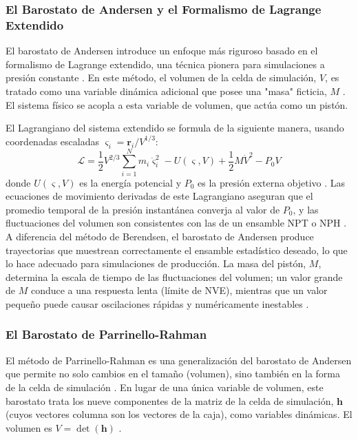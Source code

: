 \subsubsection{El Barostato de Andersen y el Formalismo de Lagrange Extendido}
El barostato de Andersen introduce un enfoque más riguroso basado en el formalismo de Lagrange extendido, una técnica pionera para simulaciones a presión constante \cite[245, 259]{frenkel2002understanding}. En este método, el volumen de la celda de simulación, $V$, es tratado como una variable dinámica adicional que posee una "masa" ficticia, $M$ \cite[165]{allen2012computer, zhou2022molecular}. El sistema físico se acopla a esta variable de volumen, que actúa como un pistón.

El Lagrangiano del sistema extendido se formula de la siguiente manera, usando coordenadas escaladas $\boldsymbol{\varsigma}_i = \mathbf{r}_i / V^{1/3}$:
$$
\mathcal{L} = \frac{1}{2} V^{2/3} \sum_{i=1}^{N} m_i \dot{\boldsymbol{\varsigma}}_i^2 - U(\boldsymbol{\varsigma}, V) + \frac{1}{2} M \dot{V}^2 - P_0 V
$$
donde $U(\boldsymbol{\varsigma}, V)$ es la energía potencial y $P_0$ es la presión externa objetivo \cite[115]{zhou2022molecular}. Las ecuaciones de movimiento derivadas de este Lagrangiano aseguran que el promedio temporal de la presión instantánea converja al valor de $P_0$, y las fluctuaciones del volumen son consistentes con las de un ensamble NPT o NPH \cite[117]{zhou2022molecular}. A diferencia del método de Berendsen, el barostato de Andersen produce trayectorias que muestrean correctamente el ensamble estadístico deseado, lo que lo hace adecuado para simulaciones de producción. La masa del pistón, $M$, determina la escala de tiempo de las fluctuaciones del volumen; un valor grande de $M$ conduce a una respuesta lenta (límite de NVE), mientras que un valor pequeño puede causar oscilaciones rápidas y numéricamente inestables \cite[117]{zhou2022molecular}.

\subsubsection{El Barostato de Parrinello-Rahman}
El método de Parrinello-Rahman es una generalización del barostato de Andersen que permite no solo cambios en el tamaño (volumen), sino también en la forma de la celda de simulación \cite[165]{allen2012computer}. En lugar de una única variable de volumen, este barostato trata los nueve componentes de la matriz de la celda de simulación, $\mathbf{h}$ (cuyos vectores columna son los vectores de la caja), como variables dinámicas. El volumen es $V = \det(\mathbf{h})$ \cite[115]{zhou2022molecular}.

